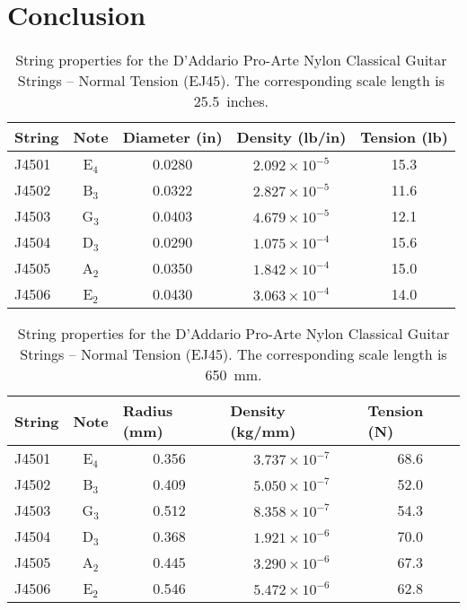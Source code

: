 %
%
%

 \section{Conclusion\label{sct:conc}}

\begin{table}[htbp]
  \centering
  \caption{\label{tbl:ej45_ips} String properties for the D'Addario Pro-Arte Nylon Classical Guitar Strings -- Normal Tension (EJ45). The corresponding scale length is 25.5~inches.}
    \begin{tabular}{lcccc}
    \hline \hline
    String  & Note  & \multicolumn{1}{l}{Diameter (in)} & \multicolumn{1}{l}{Density (lb/in)} & \multicolumn{1}{l}{Tension (lb)} \\
    \hline
    J4501 & E$_4$  & 0.0280 & $2.092 \times 10^{-5}$ & 15.3 \\
    J4502 & B$_3$  & 0.0322 & $2.827 \times 10^{-5}$ & 11.6 \\
    J4503 & G$_3$  & 0.0403 & $4.679 \times 10^{-5}$ & 12.1 \\
    J4504 & D$_3$  & 0.0290 & $1.075 \times 10^{-4}$ & 15.6 \\
    J4505 & A$_2$  & 0.0350 & $1.842 \times 10^{-4}$ & 15.0 \\
    J4506 & E$_2$  & 0.0430 & $3.063 \times 10^{-4}$ & 14.0 \\
    \hline
    \end{tabular}%
  \label{tab:addlabel}%
\end{table}%

\begin{table}[htbp]
  \centering
  \caption{\label{tbl:ej45_mks} String properties for the D'Addario Pro-Arte Nylon Classical Guitar Strings -- Normal Tension (EJ45). The corresponding scale length is 650~mm.}
    \begin{tabular}{lcccc}
    \hline \hline
    String  & Note  & \multicolumn{1}{l}{Radius (mm)} & \multicolumn{1}{l}{Density (kg/mm)} & \multicolumn{1}{l}{Tension (N)} \\
    \hline
    J4501 & E$_4$  & 0.356 & $3.737 \times 10^{-7}$ & 68.6 \\
    J4502 & B$_3$  & 0.409 & $5.050 \times 10^{-7}$ & 52.0 \\
    J4503 & G$_3$  & 0.512 & $8.358 \times 10^{-7}$ & 54.3 \\
    J4504 & D$_3$  & 0.368 & $1.921 \times 10^{-6}$ & 70.0 \\
    J4505 & A$_2$  & 0.445 & $3.290 \times 10^{-6}$ & 67.3 \\
    J4506 & E$_2$  & 0.546 & $5.472 \times 10^{-6}$ & 62.8 \\
    \hline
    \end{tabular}%
  \label{tab:addlabel}%
\end{table}%

